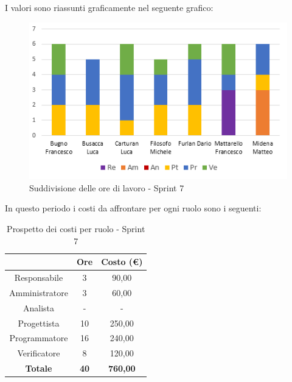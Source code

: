 I valori sono riassunti graficamente nel seguente grafico:

\begin{figure}[H]
  \centering
  \includegraphics[scale=1.0]{immagini/7Sprint_oreLavoro.png}
  \caption{Suddivisione delle ore di lavoro - Sprint 7}
\end{figure}

\pagebreak
In questo periodo i costi da affrontare per ogni ruolo sono i seguenti:

\begin{table}[H]
  \centering
  \renewcommand{\arraystretch}{1.8}
  \begin{tabular}{c|c|c}
    \rowcolor[HTML]{125E28}
    \multicolumn{1}{c}{\color[HTML]{FFFFFF}\textbf{Ruolo}}
                    & \multicolumn{1}{c}{\color[HTML]{FFFFFF}\textbf{Ore}}
                    & \multicolumn{1}{c}{\color[HTML]{FFFFFF}\textbf{Costo (€)}}                   \\
    \hline
    Responsabile    & 3                                                          & 90,00           \\
    Amministratore  & 3                                                          & 60,00           \\
    Analista        & -                                                          & -               \\
    Progettista     & 10                                                         & 250,00          \\
    Programmatore   & 16                                                         & 240,00          \\
    Verificatore    & 8                                                          & 120,00          \\
    \textbf{Totale} & \textbf{40}                                                & \textbf{760,00}
  \end{tabular}
  \caption{Prospetto dei costi per ruolo - Sprint 7}
\end{table}

